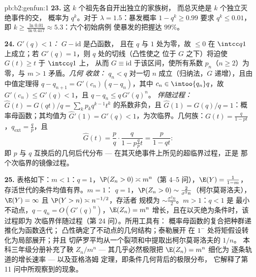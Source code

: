 \begin{solution}{pb:b2:genfun:1}
\textbf{23.} 这 $k$ 个祖先各自开出独立的家族树，
而总灭绝是 $k$ 个独立灭绝事件的交，
概率为 $q^k$。对于
$\lambda = 1.5$：暴发概率 $1 - q^k \geq 0.99$
要求 $q^k \leq 0.01$，即 $k \geq
\frac{\ln 0.01}{\ln 0.417} \approx 5.3$：六个初始病例
使暴发的把握达 $99\%$。

\textbf{24.} \emph{$G'(q) < 1$：} $G - \mathrm{id}$ 是凸函数，
且在 $q$ 与 $1$ 处为零，故 $\leq 0$ 在 $\intcc
q1$ 上成立；若 $G'(q) = 1$，则 $q$ 处的切线（凸性使之
位于 $G$ 之下）将迫使 $G(t) \geq t$ 于 $\intcc q1$ 上，
从而 $G \equiv \mathrm{id}$ 于该区间，使所有系数
$p_n$（$n \geq 2$）为零，与 $m > 1$ 矛盾。\emph{几何
收敛：} $q_n < q$ 对一切 $n$ 成立（归纳法，$G$
递增），且由中值定理得 $q - q_{n+1} =
G'(c_n)(q - q_n)$，其中 $c_n \in \intoo{q_n}q$，故 $G'(c_n)
\leq G'(q) < 1$，且 $q - q_n \leq q\,G'(q)^n$。
\emph{伴随过程：} $\widehat G(t) = G(qt)/q =
\sum_kp_kq^{k-1}t^k$ 的系数非负，且
$\widehat G(1) = G(q)/q = 1$：概率母函数；其均值为 $\widehat
G'(1) = G'(q) < 1$，为次临界。几何族：$G(t) =
\frac{q}{1-pt}$，$q_{\mathrm{ext}} = \frac qp$，且
\[
\widehat G(t) = \frac pq\cdot\frac{q}{1 - p\frac qp t}
= \frac{p}{1 - qt} :
\]
即 $p$ 与 $q$ 互换后的几何后代分布 ---
在其灭绝事件上所见的超临界过程，正是
那个次临界的镜像过程。

\textbf{25.} 表格如下：$m < 1$：$q = 1$，$\P(Z_n > 0)
\asymp m^n$（第 4--5 问），$\E(Y) = \frac1{1-m}$，
存活世代的条件均值有界。$m = 1$：
$q = 1$，$\P(Z_n > 0) \sim \frac2{\sigma^2n}$（柯尔莫哥洛夫），
$\E(Y) = \infty$ 且 $\P(Y > n) \asymp n^{-1/2}$，存活者
规模为 $\sim \frac{\sigma^2n}2$。$m > 1$：$q < 1$ 是
最小不动点，$q - q_n = O(G'(q)^n)$，$\E(Z_n) = m^n$
增长，且在以灭绝为条件时，该过程即为
次临界伴随过程（第 24 问）。所用工具有：
概率母函数的复合把种群递推化为函数迭代；
凸性确定了不动点的几何结构；泰勒展开
在 $1^-$ 处将矩假设转化为局部展开；并且
切萨罗平均从一个裂项和中提取出柯尔莫哥洛夫的 $1/n$。
本科三年级分册补充了鞅 $Z_n/
m^n$ --- 其几乎必然极限把 $\E(Z_n) = m^n$ 细化为
逐条轨道的增长速率 --- 以及亚格洛姆
定理，即条件几何背后的极限分布，
它解释了第 11 问中所观察到的现象。
\end{solution}
